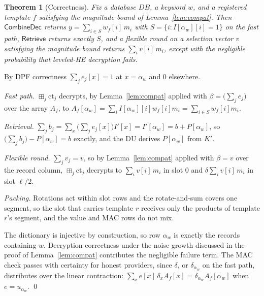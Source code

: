 \documentclass[a4paper,fleqn]{cas-sc}
\newtheorem{theorem}{Theorem}
\newcommand{\bplus}{\boxplus}
\begin{document}
\begin{theorem}[Correctness]
\label{thm:correct}
Fix a database $DB$, a keyword $w$, and a registered template $f$ satisfying
the magnitude bound of Lemma~\ref{lem:compat}. Then $\mathsf{CombineDec}$
returns $y=\sum_{i\in S} w_f[i]\,m_i$ with $S=\{i: I[\alpha_w][i]=1\}$ on the
fast path, $\mathsf{Retrieve}$ returns exactly $S$, and a flexible round on a
selection vector $v$ satisfying the magnitude bound returns
$\sum_i v[i]\,m_i$, except with the negligible probability that leveled-HE
decryption fails.
\end{theorem}
\begin{pf}
By DPF correctness $\sum_j e_j[x]=1$ at $x=\alpha_w$ and $0$ elsewhere.

\emph{Fast path.} $\bplus_j\text{ct}_j$ decrypts, by Lemma~\ref{lem:compat}
applied with $\beta=\big(\sum_j e_j\big)$ over the array $A_f$, to
$A_f[\alpha_w]=\sum_i I[\alpha_w][i]w_f[i]m_i=\sum_{i\in S}w_f[i]m_i$.

\emph{Retrieval.} $\sum_j b_j=\sum_x\big(\sum_j e_j[x]\big)
I'[x]=I'[\alpha_w]=b+P[\alpha_w]$, so $\big(\sum_j b_j\big)-P[\alpha_w]=b$
exactly, and the DU derives $P[\alpha_w]$ from $K'$.

\emph{Flexible round.} $\sum_j v_j=v$, so by Lemma~\ref{lem:compat} applied
with $\beta=v$ over the record column, $\bplus_j\text{ct}_j$ decrypts to
$\sum_i v[i]\,m_i$ in slot $0$ and $\delta\sum_i v[i]\,m_i$ in slot $\ell/2$.

\emph{Packing.} Rotations act within slot rows and the rotate-and-sum covers
one segment, so the slot that carries template $r$ receives only the products
of template $r$'s segment, and the value and MAC rows do not mix.

The dictionary is injective by construction, so row $\alpha_w$ is exactly the
records containing $w$. Decryption correctness under the noise growth
discussed in the proof of Lemma~\ref{lem:compat} contributes the negligible
failure term. The MAC check passes with certainty for honest providers, since
$\delta$, or $\delta_{\alpha_w}$ on the fast path, distributes over the linear
contraction: $\sum_x e[x]\,\delta_xA_f[x]=\delta_{\alpha_w}A_f[\alpha_w]$ when
$e=u_{\alpha_w}$. \qed
\end{pf}
\end{document}
